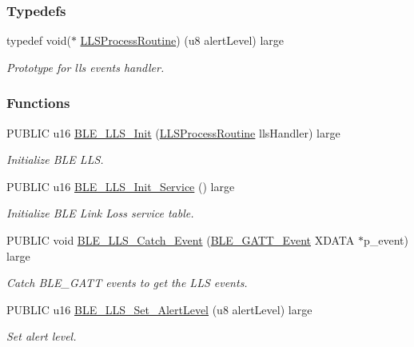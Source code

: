 \subsubsection*{Typedefs}
\begin{DoxyCompactItemize}
\item 
typedef void($\ast$ \hyperlink{group___b_l_e___l_l_s_gab9eca50948d792c9c67c5920703b1960}{L\+L\+S\+Process\+Routine}) (u8 alert\+Level) large\hypertarget{group___b_l_e___l_l_s_gab9eca50948d792c9c67c5920703b1960}{}\label{group___b_l_e___l_l_s_gab9eca50948d792c9c67c5920703b1960}

\begin{DoxyCompactList}\small\item\em Prototype for lls events handler. \end{DoxyCompactList}\end{DoxyCompactItemize}
\subsubsection*{Functions}
\begin{DoxyCompactItemize}
\item 
P\+U\+B\+L\+IC u16 \hyperlink{group___b_l_e___l_l_s_gac75ebe3de2e4ae57459da4248e44d217}{B\+L\+E\+\_\+\+L\+L\+S\+\_\+\+Init} (\hyperlink{group___b_l_e___l_l_s_gab9eca50948d792c9c67c5920703b1960}{L\+L\+S\+Process\+Routine} lls\+Handler) large
\begin{DoxyCompactList}\small\item\em Initialize B\+LE L\+LS. \end{DoxyCompactList}\item 
P\+U\+B\+L\+IC u16 \hyperlink{group___b_l_e___l_l_s_gab76210fe02e1caec3770df9c3fac092e}{B\+L\+E\+\_\+\+L\+L\+S\+\_\+\+Init\+\_\+\+Service} () large
\begin{DoxyCompactList}\small\item\em Initialize B\+LE Link Loss service table. \end{DoxyCompactList}\item 
P\+U\+B\+L\+IC void \hyperlink{group___b_l_e___l_l_s_gae2fda0ca26167be8f6fad0e442b1c912}{B\+L\+E\+\_\+\+L\+L\+S\+\_\+\+Catch\+\_\+\+Event} (\hyperlink{struct_b_l_e___g_a_t_t___event}{B\+L\+E\+\_\+\+G\+A\+T\+T\+\_\+\+Event} X\+D\+A\+TA $\ast$p\+\_\+event) large
\begin{DoxyCompactList}\small\item\em Catch B\+L\+E\+\_\+\+G\+A\+TT events to get the L\+LS events. \end{DoxyCompactList}\item 
P\+U\+B\+L\+IC u16 \hyperlink{group___b_l_e___l_l_s_ga8248836636d5aa27aa26279e8e52ba10}{B\+L\+E\+\_\+\+L\+L\+S\+\_\+\+Set\+\_\+\+Alert\+Level} (u8 alert\+Level) large
\begin{DoxyCompactList}\small\item\em Set alert level. \end{DoxyCompactList}\end{DoxyCompactItemize}


